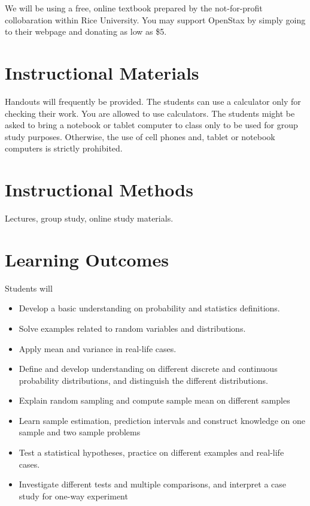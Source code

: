 \documentclass[handout]{ximera}
\begin{document}
We will be using a free, online textbook {} prepared by the not-for-profit {} collobaration within Rice University. You may support OpenStax by simply going to their webpage and donating as low as \$5.

\section*{Instructional Materials}

Handouts will frequently be provided. The students can use a calculator only for checking their work. You are allowed to use calculators.  The students might be asked to bring a notebook or tablet computer to class only to be used for group study purposes. Otherwise, the use of cell phones and, tablet or notebook computers is strictly prohibited. 

\section*{Instructional Methods}

Lectures, group study, online study materials.

\section*{Learning Outcomes}

Students will
\begin{itemize}
\item Develop a basic understanding on probability and statistics definitions.

\item Solve examples related to random variables and distributions.

\item Apply mean and variance in real-life cases.

\item Define and develop understanding on different discrete and continuous probability distributions, and distinguish the different distributions.

\item Explain random sampling and compute sample mean on different samples

\item Learn sample estimation, prediction intervals and construct knowledge on one sample and two sample problems

\item Test a statistical hypotheses, practice on different examples and real-life cases.

\item Investigate different tests and multiple comparisons, and interpret a case study for one-way experiment
\end{itemize}
\end{document}
